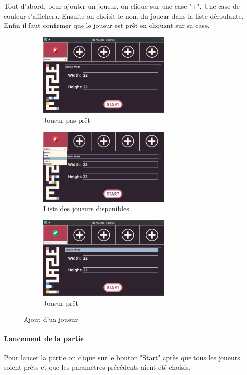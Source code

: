 Tout d'abord, pour ajouter un joueur, on clique sur une case "+". Une case de couleur s'affichera. Ensuite on choisit le nom du joueur dans la liste déroulante. Enfin il faut confirmer que le joueur est prêt en cliquant sur sa case.

\begin{figure}[h!]
    \centering
    \begin{subfigure}{6.5cm}
        \includegraphics[width=6.5cm]{ressources/Implementation/Labyrinthe/Controleur/SettingsMenu_NotReady.png}%
        \caption{Joueur pas prêt}
        \label{fig:PlayerNotReady}
    \end{subfigure}
    \qquad
    \begin{subfigure}{6.5cm}
        \includegraphics[width=6.5cm]{ressources/Implementation/Labyrinthe/Controleur/SettingsMenu_PlayerList.png}%
        \caption{Liste des joueurs disponibles}
        \label{fig:PlayersAvailable}
    \end{subfigure}
    \qquad
    \begin{subfigure}{6.5cm}
        \includegraphics[width=6.5cm]{ressources/Implementation/Labyrinthe/Controleur/SettingsMenu_Ready.png}%
        \caption{Joueur prêt}
        \label{fig:PlayerReady}
    \end{subfigure}
    \caption{Ajout d'un joueur}
    \label{fig:PlayerSelection}
\end{figure}
\FloatBarrier

\paragraph{Lancement de la partie}

Pour lancer la partie on clique sur le bouton "Start" après que tous les joueurs soient prêts et que les paramètres précédents aient été choisis.